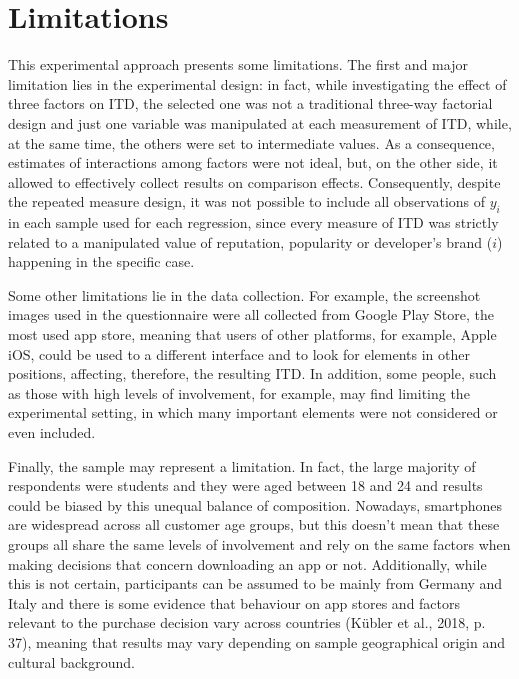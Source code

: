 \section{Limitations}
This experimental approach presents some limitations. The first and major limitation lies in the experimental design: in fact, while investigating the effect of three factors on ITD, the selected one was not a traditional three-way factorial design and just one variable was manipulated at each measurement of ITD, while, at the same time, the others were set to intermediate values. As a consequence, estimates of interactions among factors were not ideal, but, on the other side, it allowed to effectively collect results on comparison effects. Consequently, despite the repeated measure design, it was not possible to include all observations of $y_i$ in each sample used for each regression, since every measure of ITD was strictly related to a manipulated value of reputation, popularity or developer's brand ($i$) happening in the specific case. 

Some other limitations lie in the data collection. For example, the screenshot images used in the questionnaire were all collected from  Google Play Store, the most used app store, meaning that users of other platforms, for example, Apple iOS, could be used to a different interface and to look for elements in other positions, affecting, therefore, the resulting ITD. In addition, some people, such as those with high levels of involvement, for example, may find limiting the experimental setting, in which many important elements were not considered or even included. 

Finally, the sample may represent a limitation. In fact, the large majority of respondents were students and they were aged between 18 and 24 and results could be biased by this unequal balance of composition. Nowadays, smartphones are widespread across all customer age groups, but this doesn't mean that these groups all share the same levels of involvement and rely on the same factors when making decisions that concern downloading an app or not. Additionally, while this is not certain, participants can be assumed to be mainly from Germany and Italy and there is some evidence that behaviour on app stores and factors relevant to the purchase decision vary across countries (Kübler et al., 2018, p. 37), meaning that results may vary depending on sample geographical origin and cultural background.